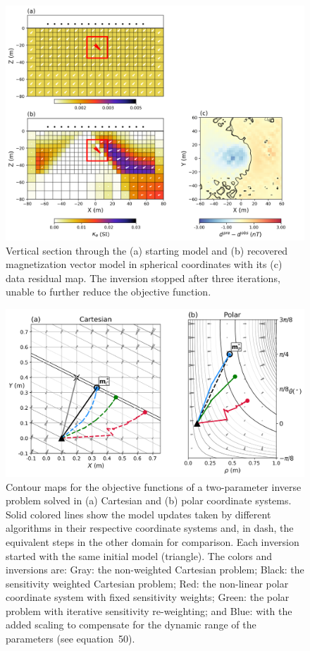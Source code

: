 \documentclass[paper]{geophysics}
\begin{document}
\begin{figure}[p!]
\includegraphics[width=\columnwidth]{Figures/Figure4.png}
\caption{ Vertical section through the (a) starting model and (b) recovered magnetization vector model in spherical coordinates with its (c) data residual map. The inversion stopped after three iterations, unable to further reduce the objective function.}
\label{MVI_S_model_noScale}
\end{figure}

\begin{figure}[p!]
\includegraphics[width=\columnwidth]{Figures/Figure5.png}
\caption{Contour maps for the objective functions of a two-parameter inverse problem solved in (a) Cartesian and (b) polar coordinate systems. Solid colored lines show the model updates taken by different algorithms in their respective coordinate systems and, in dash, the equivalent steps in the other domain for comparison. Each inversion started with the same initial model (triangle). The colors and inversions are: Gray: the non-weighted Cartesian problem; Black: the sensitivity weighted Cartesian problem; Red: the non-linear polar coordinate system with fixed sensitivity weights; Green: the polar problem with iterative sensitivity re-weighting; and Blue: with the added scaling to compensate for the dynamic range of the parameters (see equation~50). }
\label{NonLinearGN}
\end{figure}
\end{document}
